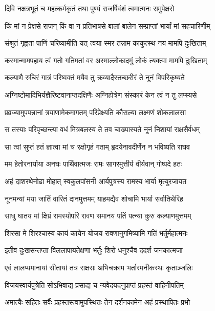 \twolineshloka
{दिवि नक्षत्रभूतं च महत्कर्मकृतं तथा}
{पुण्यं राजर्षिवंशं त्वमात्मनः समुपेक्षसे} %

\twolineshloka
{किं मां न प्रेक्षसे राजन् किं वा न प्रतिभाषसे}
{बालां बालेन सम्प्राप्तां भार्यां मां सहचारिणीम्} %

\twolineshloka
{संश्रुतं गृह्णता पाणिं चरिष्यामीति यत् त्वया}
{स्मर तन्नाम काकुत्स्थ नय मामपि दुःखिताम्} %

\twolineshloka
{कस्मान्मामपहाय त्वं गतो गतिमतां वर}
{अस्माल्लोकादमुं लोकं त्यक्त्वा मामपि दुःखिताम्} %

\twolineshloka
{कल्याणै रुचिरं गात्रं परिष्वक्तं मयैव तु}
{क्रव्यादैस्तच्छरीरं ते नूनं विपरिकृष्यते} %

\twolineshloka
{अग्निष्टोमादिभिर्यज्ञैरिष्टवानाप्तदक्षिणैः}
{अग्निहोत्रेण संस्कारं केन त्वं न तु लप्स्यसे} %

\twolineshloka
{प्रव्रज्यामुपपन्नानां त्रयाणामेकमागतम्}
{परिप्रेक्ष्यति कौसल्या लक्ष्मणं शोकलालसा} %

\twolineshloka
{स तस्याः परिपृच्छन्त्या वधं मित्रबलस्य ते}
{तव चाख्यास्यते नूनं निशायां राक्षसैर्वधम्} %

\twolineshloka
{सा त्वां सुप्तं हतं ज्ञात्वा मां च रक्षोगृहं गताम्}
{हृदयेनावदीर्णेन न भविष्यति राघव} %

\twolineshloka
{मम हेतोरनार्याया अनघः पार्थिवात्मजः}
{रामः सागरमुत्तीर्य वीर्यवान् गोष्पदे हतः} %

\twolineshloka
{अहं दाशरथेनोढा मोहात् स्वकुलपांसनी}
{आर्यपुत्रस्य रामस्य भार्या मृत्युरजायत} %

\twolineshloka
{नूनमन्यां मया जातिं वारितं दानमुत्तमम्}
{याहमद्यैव शोचामि भार्या सर्वातिथेरिह} %

\twolineshloka
{साधु घातय मां क्षिप्रं रामस्योपरि रावण}
{समानय पतिं पत्न्या कुरु कल्याणमुत्तमम्} %

\twolineshloka
{शिरसा मे शिरश्चास्य कायं कायेन योजय}
{रावणानुगमिष्यामि गतिं भर्तुर्महात्मनः} %

\twolineshloka
{इतीव दुःखसन्तप्ता विललापायतेक्षणा}
{भर्तुः शिरो धनुश्चैव ददर्श जनकात्मजा} %

\twolineshloka
{एवं लालप्यमानायां सीतायां तत्र राक्षसः}
{अभिचक्राम भर्तारमनीकस्थः कृताञ्जलिः} %

\twolineshloka
{विजयस्वार्यपुत्रेति सोऽभिवाद्य प्रसाद्य च}
{न्यवेदयदनुप्राप्तं प्रहस्तं वाहिनीपतिम्} %

\twolineshloka
{अमात्यैः सहितः सर्वैः प्रहस्तस्त्वामुपस्थितः}
{तेन दर्शनकामेन अहं प्रस्थापितः प्रभो} %

